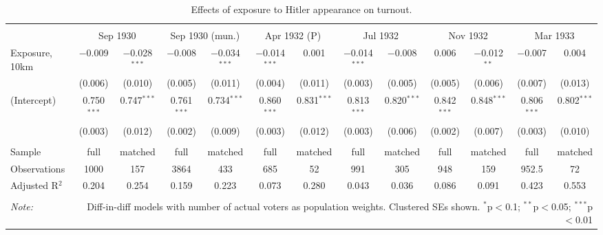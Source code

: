 
\begin{table}[!htbp] \centering 
  \caption{Effects of exposure to Hitler appearance on turnout.\vspace{-.25cm}} 
  \label{tab:turnout-dd} 
\scriptsize 
\begin{tabular}{@{\extracolsep{5pt}}lcccccccccccc} 
\\[-1.8ex]\hline 
\hline \\[-1.8ex] 
 & \multicolumn{2}{c}{Sep 1930} & \multicolumn{2}{c}{Sep 1930 (mun.)} & \multicolumn{2}{c}{Apr 1932 (P)} & \multicolumn{2}{c}{Jul 1932} & \multicolumn{2}{c}{Nov 1932} & \multicolumn{2}{c}{Mar 1933} \\ 
 \cmidrule(r){2-3}\cmidrule(r){4-5}\cmidrule(r){6-7}\cmidrule(r){8-9}\cmidrule(r){10-11}\cmidrule(r){12-13}Exposure, 10km & $-$0.009 & $-$0.028$^{***}$ & $-$0.008 & $-$0.034$^{***}$ & $-$0.014$^{***}$ & 0.001 & $-$0.014$^{***}$ & $-$0.008 & 0.006 & $-$0.012$^{**}$ & $-$0.007 & 0.004 \\ 
  & (0.006) & (0.010) & (0.005) & (0.011) & (0.004) & (0.011) & (0.003) & (0.005) & (0.005) & (0.006) & (0.007) & (0.013) \\ 
  (Intercept) & 0.750$^{***}$ & 0.747$^{***}$ & 0.761$^{***}$ & 0.734$^{***}$ & 0.860$^{***}$ & 0.831$^{***}$ & 0.813$^{***}$ & 0.820$^{***}$ & 0.842$^{***}$ & 0.848$^{***}$ & 0.806$^{***}$ & 0.802$^{***}$ \\ 
  & (0.003) & (0.012) & (0.002) & (0.009) & (0.003) & (0.012) & (0.003) & (0.006) & (0.002) & (0.007) & (0.003) & (0.010) \\ 
 \hline \\[-1.8ex] 
Sample & full & matched & full & matched & full & matched & full & matched & full & matched & full & matched \\ 
Observations & 1000 & 157 & 3864 & 433 & 685 & 52 & 991 & 305 & 948 & 159 & 952.5 & 72 \\ 
Adjusted R$^{2}$ & 0.204 & 0.254 & 0.159 & 0.223 & 0.073 & 0.280 & 0.043 & 0.036 & 0.086 & 0.091 & 0.423 & 0.553 \\ 
\hline 
\hline \\[-1.8ex] 
\textit{Note:}  & \multicolumn{12}{r}{Diff-in-diff models with number of actual voters as population weights. Clustered SEs shown. $^{*}$p$<$0.1; $^{**}$p$<$0.05; $^{***}$p$<$0.01} \\ 
\end{tabular} 
\end{table} 
